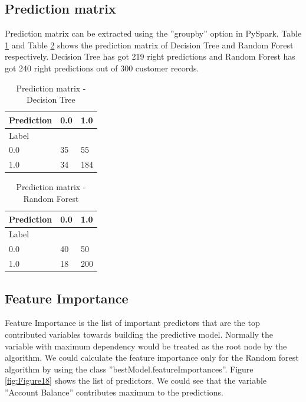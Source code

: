 \documentclass[sigconf]{acmart}
\begin{document}
\subsection{Prediction matrix} 

Prediction matrix can be extracted using the ''groupby'' option in PySpark. Table \ref{tab:table6} and Table \ref{tab:table7} shows the prediction matrix of Decision Tree and Random Forest respectively. Decision Tree has got 219 right predictions and Random Forest has got 240 right predictions out of 300 customer records.


\begin{table}[]
\centering
\caption{Prediction matrix - Decision Tree}
\label{tab:table6}
\begin{tabular}{|l|l|l|}
\hline
\multicolumn{1}{|c|}{Prediction} & 0.0       & 1.0       \\ \hline
Label                            & \multicolumn{2}{l|}{} \\ \hline
0.0                              & 35        & 55        \\ \hline
1.0                              & 34        & 184       \\ \hline
\end{tabular}
\end{table}

\begin{table}[]
\centering
\caption{Prediction matrix - Random Forest}
\label{tab:table7}
\begin{tabular}{|l|l|l|}
\hline
\multicolumn{1}{|c|}{Prediction} & 0.0       & 1.0       \\ \hline
Label                            & \multicolumn{2}{l|}{} \\ \hline
0.0                              & 40        & 50        \\ \hline
1.0                              & 18        & 200       \\ \hline
\end{tabular}
\end{table}

\subsection{Feature Importance} 

Feature Importance is the list of important predictors that are the top contributed variables towards building the predictive model. Normally the variable with maximum dependency would be treated as the root node by the algorithm. We could calculate the feature importance only for the Random forest algorithm by using the class ''bestModel.featureImportances''. Figure \ref{fig:Figure18} shows the list of predictors. We could see that the variable ''Account Balance'' contributes maximum to the predictions. 
\end{document}
